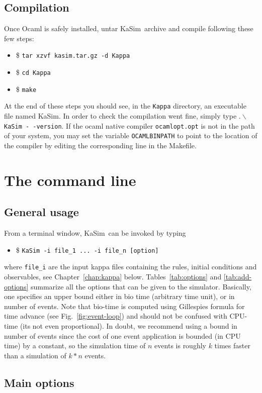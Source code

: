 \documentclass[11pt]{book}
\def\KaSim{\textsf{KaSim}}
\def\ttt#1{\texttt{#1}}
\def\bs{\backslash}
\def\ITE#1{\begin{itemize}#1\end{itemize}}
\begin{document}
\section{Compilation}
Once Ocaml is safely installed, untar \KaSim~archive and compile following these few steps:
\ITE{
\item[\$]\ttt{tar xzvf kasim.tar.gz -d Kappa}
\item[\$]\ttt{cd Kappa}
\item[\$]\ttt{make}
}
At the end of these steps you should see, in the \ttt{Kappa} directory, an executable file named KaSim.  In order to check the compilation went fine, simply type $.\bs$\ttt{KaSim -\,-version}. If the ocaml native compiler \ttt{ocamlopt.opt} is not in the path of your system, you may set the variable \ttt{OCAMLBINPATH} to point to the location of the compiler by editing the corresponding line in the Makefile.

\chapter{The command line}\label{chap:cl}

\section{General usage}
From a terminal window, \KaSim~can be invoked by typing 
\ITE{
\item[\$] \ttt{KaSim -i file\_1 ... -i file\_n [option] }
}
where \ttt{file\_i} are the input kappa files containing the rules, initial conditions and observables, see Chapter~\ref{chap:kappa} below. Tables~\ref{tab:options} and \ref{tab:add-options} summarize all the options that can be given to the simulator. Basically, one specifies an upper bound either in bio time (arbitrary time unit), or in number of events. Note that bio-time is computed using Gillespie\textquotesingle s formula for time advance (see Fig.~\ref{fig:event-loop}) and should not be confused with CPU-time (it\textquotesingle s not even proportional). In doubt, we recommend using a bound in number of events since the cost of one event application is bounded (in CPU time) by a constant, so the simulation time of $n$ events is roughly $k$ times faster than a simulation of $k*n$ events.

\section{Main options}
\end{document}
